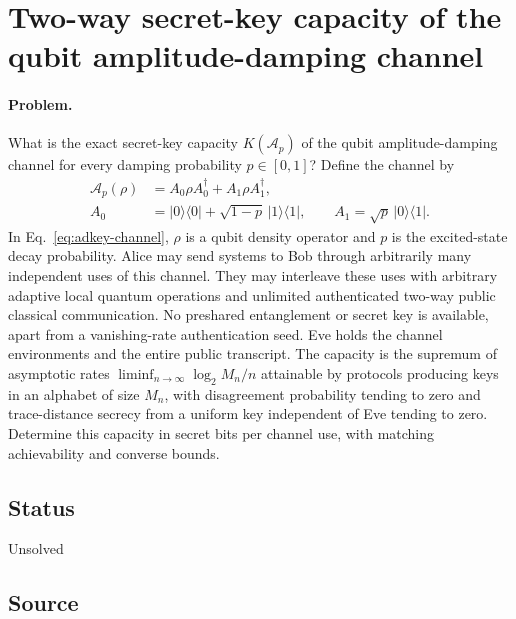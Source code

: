 \section{Two-way secret-key capacity of the qubit amplitude-damping channel}
\label{sec:op_c4726b570e765f51}

\paragraph{Problem.}
What is the exact secret-key capacity $K(\mathcal A_p)$ of the qubit amplitude-damping channel for every damping probability $p\in[0,1]$? Define the channel by
\begin{equation}
  \begin{aligned}
    \mathcal A_p(\rho)&=A_0\rho A_0^\dagger+A_1\rho A_1^\dagger,\\
    A_0&=\lvert0\rangle\!\langle0\rvert+\sqrt{1-p}\,\lvert1\rangle\!\langle1\rvert,
    \qquad A_1=\sqrt p\,\lvert0\rangle\!\langle1\rvert.
  \end{aligned}
  \label{eq:adkey-channel}
\end{equation}
In Eq.~\eqref{eq:adkey-channel}, $\rho$ is a qubit density operator and $p$ is the excited-state decay probability. Alice may send systems to Bob through arbitrarily many independent uses of this channel. They may interleave these uses with arbitrary adaptive local quantum operations and unlimited authenticated two-way public classical communication. No preshared entanglement or secret key is available, apart from a vanishing-rate authentication seed. Eve holds the channel environments and the entire public transcript. The capacity is the supremum of asymptotic rates $\liminf_{n\to\infty}\log_2 M_n/n$ attainable by protocols producing keys in an alphabet of size $M_n$, with disagreement probability tending to zero and trace-distance secrecy from a uniform key independent of Eve tending to zero. Determine this capacity in secret bits per channel use, with matching achievability and converse bounds.

\subsection*{Status}

Unsolved

\subsection*{Source}

